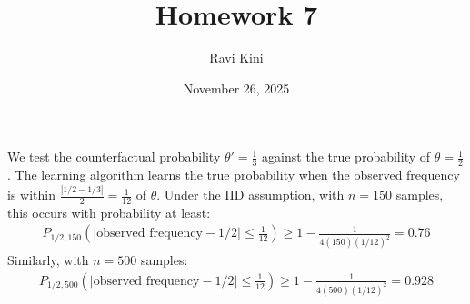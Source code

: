 \documentclass{article}
\title{Homework 7}
\author{Ravi Kini}
\date{November 26, 2025}
\begin{document}
\maketitle

\problem{}
We test the counterfactual probability $\theta' = \frac{1}{3}$ against the true probability of $\theta = \frac{1}{2}$. The learning algorithm learns the true probability when the observed frequency is within $\frac{|1/2 - 1/3|}{2} = \frac{1}{12}$ of $\theta$. Under the IID assumption, with $n = 150$ samples, this occurs with probability at least:
\begin{align*}
    P_{1/2, 150}(|\text{observed frequency} - 1/2| \leq \frac{1}{12}) \geq 1 - \frac{1}{4(150){(1/12)}^2} = 0.76
\end{align*}
Similarly, with $n = 500$ samples:
\begin{align*}
    P_{1/2, 500}(|\text{observed frequency} - 1/2| \leq \frac{1}{12}) \geq 1 - \frac{1}{4(500){(1/12)}^2} = 0.928
\end{align*}
\end{document}
